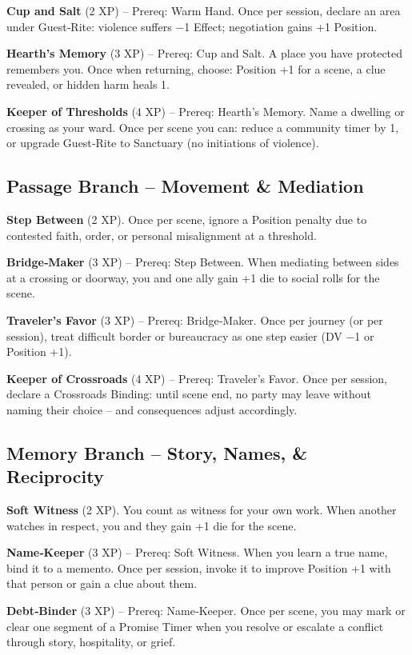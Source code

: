 \documentclass[10pt,a5paper]{book}
\begin{document}
\textbf{Cup and Salt} (2 XP) -- Prereq: Warm Hand. Once per session, declare an area under Guest‑Rite: violence suffers −1 Effect; negotiation gains +1 Position.

\textbf{Hearth's Memory} (3 XP) -- Prereq: Cup and Salt. A place you have protected remembers you. Once when returning, choose: Position +1 for a scene, a clue revealed, or hidden harm heals 1.

\textbf{Keeper of Thresholds} (4 XP) -- Prereq: Hearth's Memory. Name a dwelling or crossing as your ward. Once per scene you can: reduce a community timer by 1, or upgrade Guest‑Rite to Sanctuary (no initiations of violence).

\subsection{Passage Branch -- Movement \& Mediation}

\textbf{Step Between} (2 XP). Once per scene, ignore a Position penalty due to contested faith, order, or personal misalignment at a threshold.

\textbf{Bridge‑Maker} (3 XP) -- Prereq: Step Between. When mediating between sides at a crossing or doorway, you and one ally gain +1 die to social rolls for the scene.

\textbf{Traveler's Favor} (3 XP) -- Prereq: Bridge‑Maker. Once per journey (or per session), treat difficult border or bureaucracy as one step easier (DV −1 or Position +1).

\textbf{Keeper of Crossroads} (4 XP) -- Prereq: Traveler's Favor. Once per session, declare a Crossroads Binding: until scene end, no party may leave without naming their choice -- and consequences adjust accordingly.

\subsection{Memory Branch -- Story, Names, \& Reciprocity}

\textbf{Soft Witness} (2 XP). You count as witness for your own work. When another watches in respect, you and they gain +1 die for the scene.

\textbf{Name‑Keeper} (3 XP) -- Prereq: Soft Witness. When you learn a true name, bind it to a memento. Once per session, invoke it to improve Position +1 with that person or gain a clue about them.

\textbf{Debt‑Binder} (3 XP) -- Prereq: Name‑Keeper. Once per scene, you may mark or clear one segment of a Promise Timer when you resolve or escalate a conflict through story, hospitality, or grief.
\end{document}
